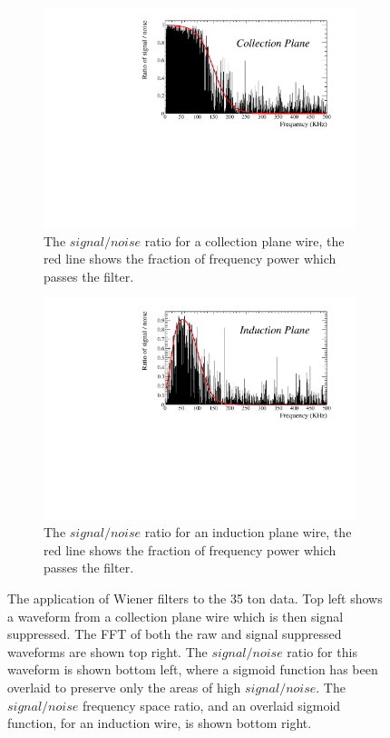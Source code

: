 \begin{figure}[h!]
\begin{subfigure}{0.48\textwidth}
    \centering
    \includegraphics[width=\textwidth]{Collection}
    \caption{The $signal/noise$ ratio for a collection plane wire, the red line shows the fraction of frequency power which passes the filter.}
    \label{fig:FreqCollection}
  \end{subfigure}%
  \hspace{0.03\textwidth}%
  \begin{subfigure}{0.48\textwidth}
    \centering
    \includegraphics[width=\textwidth]{Induction}
    \caption{The $signal/noise$ ratio for an induction plane wire, the red line shows the fraction of frequency power which passes the filter.}
    \label{fig:FreqInduction}
  \end{subfigure}
  \caption[Applying Wiener filters to the 35 ton data]
          {The application of Wiener filters to the 35 ton data. Top left shows a waveform from a collection plane wire which is then signal suppressed. The FFT of both the raw and signal suppressed waveforms are shown top right. The $signal/noise$ ratio for this waveform is shown bottom left, where a sigmoid function has been overlaid to preserve only the areas of high $signal/noise$. The $signal/noise$ frequency space ratio, and an overlaid sigmoid function, for an induction wire, is shown bottom right.}
  \label{fig:FrequencyFilter}
\end{figure}

